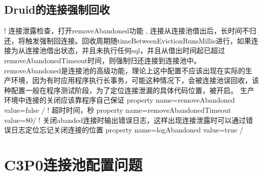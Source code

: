 \documentclass[letterpaper,10pt,english]{sphinxmanual}
\begin{document}
\subsection{Druid的连接强制回收}
\label{\detokenize{interface/druid:id3}}
\begin{sphinxVerbatim}[commandchars=\\\{\}]
\PYGZlt{}!\PYGZhy{}\PYGZhy{} 连接泄露检查，打开removeAbandoned功能 , 连接从连接池借出后，长时间不归还，将触发强制回连接。回收周期随timeBetweenEvictionRunsMillis进行，如果连接为从连接池借出状态，并且未执行任何sql，并且从借出时间起已超过removeAbandonedTimeout时间，则强制归还连接到连接池中。
removeAbandoned是连接池的高级功能，理论上这中配置不应该出现在实际的生产环境，因为有时应用程序执行长事务，可能这种情况下，会被连接池误回收，该种配置一般在程序测试阶段，为了定位连接泄漏的具体代码位置，被开启。
生产环境中连接的关闭应该靠程序自己保证 \PYGZhy{}\PYGZhy{}\PYGZgt{}
\PYGZlt{}property name=\PYGZdq{}removeAbandoned\PYGZdq{} value=\PYGZdq{}false\PYGZdq{} /\PYGZgt{}
\PYGZlt{}!\PYGZhy{}\PYGZhy{} 超时时间，秒 \PYGZhy{}\PYGZhy{}\PYGZgt{}
\PYGZlt{}property name=\PYGZdq{}removeAbandonedTimeout\PYGZdq{} value=\PYGZdq{}80\PYGZdq{}/\PYGZgt{}
\PYGZlt{}!\PYGZhy{}\PYGZhy{} 关闭abanded连接时输出错误日志，这样出现连接泄露时可以通过错误日志定位忘记关闭连接的位置 \PYGZhy{}\PYGZhy{}\PYGZgt{}
\PYGZlt{}property name=\PYGZdq{}logAbandoned\PYGZdq{} value=\PYGZdq{}true\PYGZdq{} /\PYGZgt{}
\end{sphinxVerbatim}


\section{C3P0连接池配置问题}
\label{\detokenize{interface/c3p0:c3p0}}\label{\detokenize{interface/c3p0::doc}}
\end{document}
